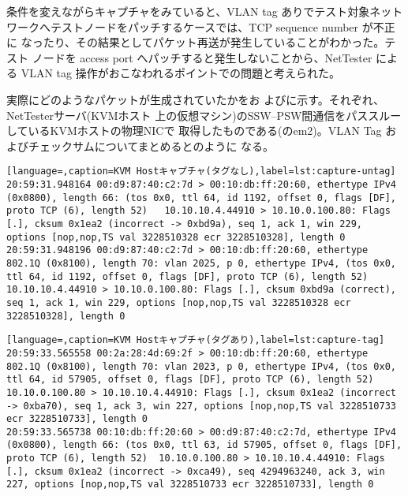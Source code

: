 条件を変えながらキャプチャをみていると、VLAN tag ありでテスト対象ネット
ワークへテストノードをパッチするケースでは、TCP sequence number が不正に
なったり、その結果としてパケット再送が発生していることがわかった。テスト
ノードを access port へパッチすると発生しないことから、NetTester による
VLAN tag 操作がおこなわれるポイントでの問題と考えられた。

実際にどのようなパケットが生成されていたかをお
よびに示す。それぞれ、NetTesterサーバ(KVMホスト
上の仮想マシン)のSSW--PSW間通信をパススルーしているKVMホストの物理NICで
取得したものである(のem2)。VLAN Tag
およびチェックサムについてまとめるとのように
なる。

\begin{lstlisting}[language=,caption=KVM Hostキャプチャ(タグなし),label=lst:capture-untag]
20:59:31.948164 00:d9:87:40:c2:7d > 00:10:db:ff:20:60, ethertype IPv4 (0x0800), length 66: (tos 0x0, ttl 64, id 1192, offset 0, flags [DF], proto TCP (6), length 52)	10.10.10.4.44910 > 10.10.0.100.80: Flags [.], cksum 0x1ea2 (incorrect -> 0xbd9a), seq 1, ack 1, win 229, options [nop,nop,TS val 3228510328 ecr 3228510328], length 0
20:59:31.948196 00:d9:87:40:c2:7d > 00:10:db:ff:20:60, ethertype 802.1Q (0x8100), length 70: vlan 2025, p 0, ethertype IPv4, (tos 0x0, ttl 64, id 1192, offset 0, flags [DF], proto TCP (6), length 52)	10.10.10.4.44910 > 10.10.0.100.80: Flags [.], cksum 0xbd9a (correct), seq 1, ack 1, win 229, options [nop,nop,TS val 3228510328 ecr 3228510328], length 0
\end{lstlisting}

\begin{lstlisting}[language=,caption=KVM Hostキャプチャ(タグあり),label=lst:capture-tag]
20:59:33.565558 00:2a:28:4d:69:2f > 00:10:db:ff:20:60, ethertype 802.1Q (0x8100), length 70: vlan 2023, p 0, ethertype IPv4, (tos 0x0, ttl 64, id 57905, offset 0, flags [DF], proto TCP (6), length 52)	10.10.0.100.80 > 10.10.10.4.44910: Flags [.], cksum 0x1ea2 (incorrect -> 0xba70), seq 1, ack 3, win 227, options [nop,nop,TS val 3228510733 ecr 3228510733], length 0 
20:59:33.565738 00:10:db:ff:20:60 > 00:d9:87:40:c2:7d, ethertype IPv4 (0x0800), length 66: (tos 0x0, ttl 63, id 57905, offset 0, flags [DF], proto TCP (6), length 52)	10.10.0.100.80 > 10.10.10.4.44910: Flags [.], cksum 0x1ea2 (incorrect -> 0xca49), seq 4294963240, ack 3, win 227, options [nop,nop,TS val 3228510733 ecr 3228510733], length 0
\end{lstlisting}

